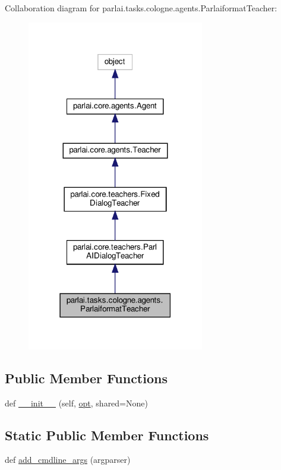 Collaboration diagram for parlai.\+tasks.\+cologne.\+agents.\+Parlaiformat\+Teacher\+:
\nopagebreak
\begin{figure}[H]
\begin{center}
\leavevmode
\includegraphics[width=219pt]{classparlai_1_1tasks_1_1cologne_1_1agents_1_1ParlaiformatTeacher__coll__graph}
\end{center}
\end{figure}
\subsection*{Public Member Functions}
\begin{DoxyCompactItemize}
\item 
def \hyperlink{classparlai_1_1tasks_1_1cologne_1_1agents_1_1ParlaiformatTeacher_ad9d9559b0ee3eb828922727fa79dcae8}{\+\_\+\+\_\+init\+\_\+\+\_\+} (self, \hyperlink{classparlai_1_1core_1_1agents_1_1Teacher_a3ce6243860ce978a897922863ed32fa4}{opt}, shared=None)
\end{DoxyCompactItemize}
\subsection*{Static Public Member Functions}
\begin{DoxyCompactItemize}
\item 
def \hyperlink{classparlai_1_1tasks_1_1cologne_1_1agents_1_1ParlaiformatTeacher_aa7751152b46ca44ceb7f4bce0d951502}{add\+\_\+cmdline\+\_\+args} (argparser)
\end{DoxyCompactItemize}
